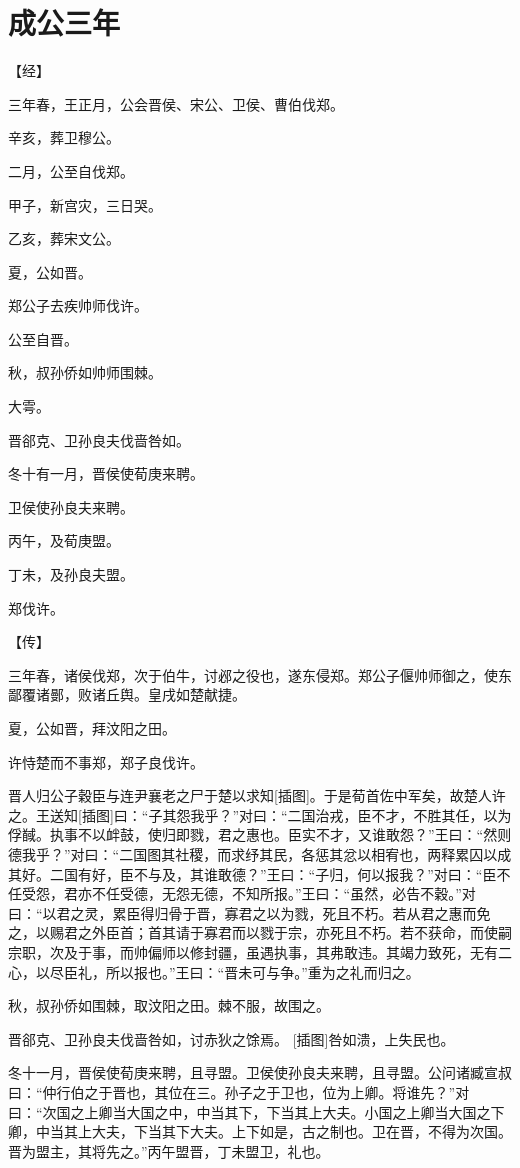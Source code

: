 \documentclass[a4paper,12pt,UTF8,twoside]{ctexbook}
\begin{document}
\section{成公三年}

【经】

三年春，王正月，公会晋侯、宋公、卫侯、曹伯伐郑。

辛亥，葬卫穆公。

二月，公至自伐郑。

甲子，新宫灾，三日哭。

乙亥，葬宋文公。

夏，公如晋。

郑公子去疾帅师伐许。

公至自晋。

秋，叔孙侨如帅师围棘。

大雩。

晋郤克、卫孙良夫伐啬咎如。

冬十有一月，晋侯使荀庚来聘。

卫侯使孙良夫来聘。

丙午，及荀庚盟。

丁未，及孙良夫盟。

郑伐许。

【传】

三年春，诸侯伐郑，次于伯牛，讨邲之役也，遂东侵郑。郑公子偃帅师御之，使东鄙覆诸鄤，败诸丘舆。皇戌如楚献捷。

夏，公如晋，拜汶阳之田。

许恃楚而不事郑，郑子良伐许。

晋人归公子穀臣与连尹襄老之尸于楚以求知[插图]。于是荀首佐中军矣，故楚人许之。王送知[插图]曰：“子其怨我乎？”对曰：“二国治戎，臣不才，不胜其任，以为俘馘。执事不以衅鼓，使归即戮，君之惠也。臣实不才，又谁敢怨？”王曰：“然则德我乎？”对曰：“二国图其社稷，而求纾其民，各惩其忿以相宥也，两释累囚以成其好。二国有好，臣不与及，其谁敢德？”王曰：“子归，何以报我？”对曰：“臣不任受怨，君亦不任受德，无怨无德，不知所报。”王曰：“虽然，必告不穀。”对曰：“以君之灵，累臣得归骨于晋，寡君之以为戮，死且不朽。若从君之惠而免之，以赐君之外臣首；首其请于寡君而以戮于宗，亦死且不朽。若不获命，而使嗣宗职，次及于事，而帅偏师以修封疆，虽遇执事，其弗敢违。其竭力致死，无有二心，以尽臣礼，所以报也。”王曰：“晋未可与争。”重为之礼而归之。

秋，叔孙侨如围棘，取汶阳之田。棘不服，故围之。

晋郤克、卫孙良夫伐啬咎如，讨赤狄之馀焉。 [插图]咎如溃，上失民也。

冬十一月，晋侯使荀庚来聘，且寻盟。卫侯使孙良夫来聘，且寻盟。公问诸臧宣叔曰：“仲行伯之于晋也，其位在三。孙子之于卫也，位为上卿。将谁先？”对曰：“次国之上卿当大国之中，中当其下，下当其上大夫。小国之上卿当大国之下卿，中当其上大夫，下当其下大夫。上下如是，古之制也。卫在晋，不得为次国。晋为盟主，其将先之。”丙午盟晋，丁未盟卫，礼也。
\end{document}
